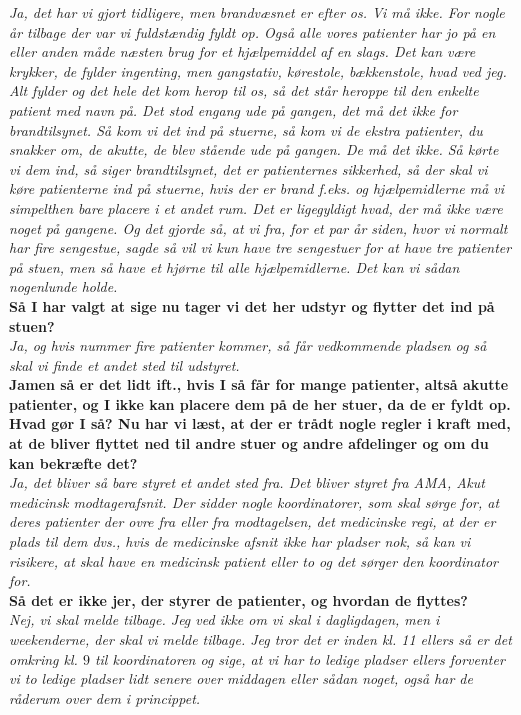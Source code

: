 \noindent
\textit{Ja, det har vi gjort tidligere, men brandvæsnet er efter os. Vi må ikke. For nogle år tilbage der var vi fuldstændig fyldt op. Også alle vores patienter har jo på en eller anden måde næsten brug for et hjælpemiddel af en slags. Det kan være krykker, de fylder ingenting, men gangstativ, kørestole, bækkenstole, hvad ved jeg. Alt fylder og det hele det kom herop til os, så det står heroppe til den enkelte patient med navn på. Det stod engang ude på gangen, det må det ikke for brandtilsynet. Så kom vi det ind på stuerne, så kom vi de ekstra patienter, du snakker om, de akutte, de blev stående ude på gangen. De må det ikke. Så kørte vi dem ind, så siger brandtilsynet, det er patienternes sikkerhed, så der skal vi køre patienterne ind på stuerne, hvis der er brand f.eks. og hjælpemidlerne må vi simpelthen bare placere i et andet rum. Det er ligegyldigt hvad, der må ikke være noget på gangene. Og det gjorde så, at vi fra, for et par år siden, hvor vi normalt har fire sengestue, sagde så vil vi kun have tre sengestuer for at have tre patienter på stuen, men så have et hjørne til alle hjælpemidlerne. Det kan vi sådan nogenlunde holde.}\\
\noindent
\textbf{Så I har valgt at sige nu tager vi det her udstyr og flytter det ind på stuen?}\\
\noindent
\textit{Ja, og hvis nummer fire patienter kommer, så får vedkommende pladsen og så skal vi finde et andet sted til udstyret.}\\
\noindent
\textbf{Jamen så er det lidt ift., hvis I så får for mange patienter, altså akutte patienter, og I ikke kan placere dem på de her stuer, da de er fyldt op. Hvad gør I så? Nu har vi læst, at der er trådt nogle regler i kraft med, at de bliver flyttet ned til andre stuer og andre afdelinger og om du kan bekræfte det?}\\
\noindent
\textit{Ja, det bliver så bare styret et andet sted fra. Det bliver styret fra AMA, Akut medicinsk modtagerafsnit. Der sidder nogle koordinatorer, som skal sørge for, at deres patienter der ovre fra eller fra modtagelsen, det medicinske regi, at der er plads til dem dvs., hvis de medicinske afsnit ikke har pladser nok, så kan vi risikere, at skal have en medicinsk patient eller to og det sørger den koordinator for.} \\
\noindent
\textbf{Så det er ikke jer, der styrer de patienter, og hvordan de flyttes?}\\
\noindent
\textit{Nej, vi skal melde tilbage. Jeg ved ikke om vi skal i dagligdagen, men i weekenderne, der skal vi melde tilbage. Jeg tror det er inden kl. 11 ellers så er det omkring kl. $9$ til koordinatoren og sige, at vi har to ledige pladser ellers forventer vi to ledige pladser lidt senere over middagen eller sådan noget, også har de råderum over dem i princippet.}\\

